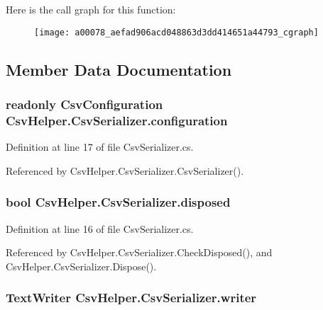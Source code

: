 Here is the call graph for this function\-:
\nopagebreak
\begin{figure}[H]
\begin{center}
\leavevmode
\texttt{[image: a00078\_aefad906acd048863d3dd414651a44793\_cgraph]}
\end{center}
\end{figure}




\subsection{Member Data Documentation}
\hypertarget{a00078_ae8c56ff97c0a797245f2205c486833ea}{
\subsubsection[{configuration}]{\setlength{\rightskip}{0pt plus 5cm}readonly {\bf Csv\-Configuration} Csv\-Helper.\-Csv\-Serializer.\-configuration\hspace{0.3cm}{\ttfamily [private]}}}\label{a00078_ae8c56ff97c0a797245f2205c486833ea}


Definition at line 17 of file Csv\-Serializer.\-cs.



Referenced by Csv\-Helper.\-Csv\-Serializer.\-Csv\-Serializer().

\hypertarget{a00078_a2687885dae7f7b0eec3c2db81c05f7e4}{
\subsubsection[{disposed}]{\setlength{\rightskip}{0pt plus 5cm}bool Csv\-Helper.\-Csv\-Serializer.\-disposed\hspace{0.3cm}{\ttfamily [private]}}}\label{a00078_a2687885dae7f7b0eec3c2db81c05f7e4}


Definition at line 16 of file Csv\-Serializer.\-cs.



Referenced by Csv\-Helper.\-Csv\-Serializer.\-Check\-Disposed(), and Csv\-Helper.\-Csv\-Serializer.\-Dispose().

\hypertarget{a00078_adfb235fa2c868fc79c0376fd12fda767}{
\subsubsection[{writer}]{\setlength{\rightskip}{0pt plus 5cm}Text\-Writer Csv\-Helper.\-Csv\-Serializer.\-writer\hspace{0.3cm}{\ttfamily [private]}}}\label{a00078_adfb235fa2c868fc79c0376fd12fda767}



